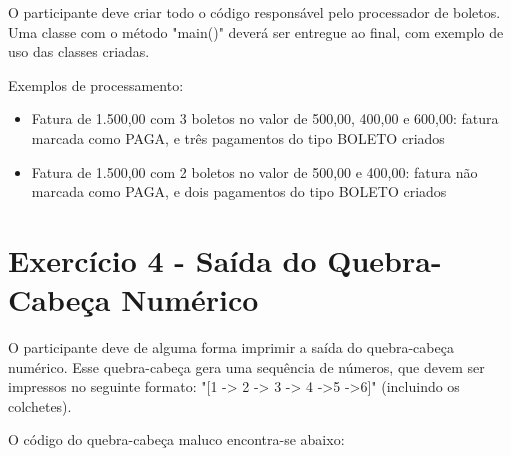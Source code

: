 O participante deve criar todo o código responsável pelo processador de boletos. Uma classe com
o método "main()" deverá ser entregue ao final, com exemplo de uso das classes criadas.

Exemplos de processamento:

\begin{itemize}
	\item Fatura de 1.500,00 com 3 boletos no valor de 500,00, 400,00 e 600,00: fatura marcada como PAGA, e três pagamentos do tipo BOLETO criados 
	\item Fatura de 1.500,00 com 2 boletos no valor de 500,00 e 400,00: fatura não marcada como PAGA, e dois pagamentos do tipo BOLETO criados 
\end{itemize}

\section{Exercício 4 - Saída do Quebra-Cabeça Numérico}

O participante deve de alguma forma imprimir a saída do quebra-cabeça numérico. Esse quebra-cabeça gera
uma sequência de números, que devem ser impressos no seguinte formato: "[1 -> 2 -> 3 -> 4 ->5 ->6]" (incluindo os colchetes).

O código do quebra-cabeça maluco encontra-se abaixo:


